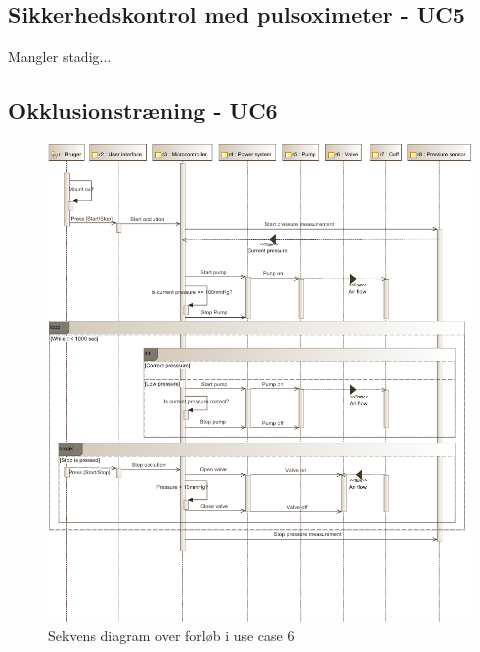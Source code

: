 \newpage

\subsection{Sikkerhedskontrol med pulsoximeter - UC5}
Mangler stadig...

\subsection{Okklusionstræning - UC6}
\begin{figure}[H]
	\includegraphics[width=\textwidth]{SystemArkitektur/pdfs/SD_UC6-crop.pdf}
\caption{Sekvens diagram over forløb i use case 6}
\end{figure}
\newpage

